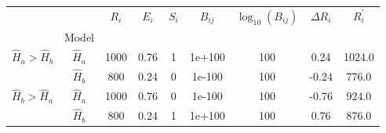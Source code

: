 \begin{tabular}{|cc|c|c|c|c|c|c|c|}
    \hline
                            &             &                                    $R_i$ &                                    $E_i$ &                                    $S_i$ &                                 $B_{ij}$ &                       $\log_{10}(B_{ij})$ &                             $\Delta R_i$ &                           $R_i^{\prime}$ \\
     & Model &                                          &                                          &                                          &                                          &                                          &                                          &                                          \\
    \hline \multirow{2}{*}{$\hat{H}_a > \hat{H}_b$} & $\hat{H}_a$ &                                     1000 &                                     0.76 &                                        1 &                                   1e+100 &                                      100 &                                     0.24 &                                   1024.0 \\
                            & $\hat{H}_b$ &                                      800 &                                     0.24 &                                        0 &                                   1e-100 &                                      100 &                                    -0.24 &                                    776.0 \\
    \cline{1-9}
    \hline \multirow{2}{*}{$\hat{H}_b > \hat{H}_a$} & $\hat{H}_a$ &                                     1000 &                                     0.76 &                                        0 &                                   1e-100 &                                      100 &                                    -0.76 &                                    924.0 \\
                            & $\hat{H}_b$ &                                      800 &                                     0.24 &                                        1 &                                   1e+100 &                                      100 &                                     0.76 &                                    876.0 \\
    \hline
    \end{tabular}
    